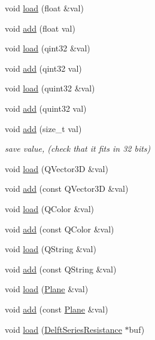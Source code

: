 \begin{DoxyCompactItemize}
void \hyperlink{classShipCAD_1_1FileBuffer_a525306d68a017ef67ec13c3e8901a8ff}{load} (float \&val)
\item 
void \hyperlink{classShipCAD_1_1FileBuffer_a7909794ac33ad5f695bb670940db99ba}{add} (float val)
\item 
void \hyperlink{classShipCAD_1_1FileBuffer_ad7fc82d31f73f0350715fb63db2fc271}{load} (qint32 \&val)
\item 
void \hyperlink{classShipCAD_1_1FileBuffer_ad5ff9b7299df09feb365250c69e6da9a}{add} (qint32 val)
\item 
void \hyperlink{classShipCAD_1_1FileBuffer_a19fcd1363671552150de3d6ee3297f2c}{load} (quint32 \&val)
\item 
void \hyperlink{classShipCAD_1_1FileBuffer_a1dd1963dd35caff15333f21cc2195b34}{add} (quint32 val)
\item 
void \hyperlink{classShipCAD_1_1FileBuffer_aa22983fa24559f6d0d119d89036100af}{add} (size\-\_\-t val)
\begin{DoxyCompactList}\small\item\em save value, (check that it fits in 32 bits) \end{DoxyCompactList}\item 
void \hyperlink{classShipCAD_1_1FileBuffer_a7255342a053689ebafda9317cc586c57}{load} (Q\-Vector3\-D \&val)
\item 
void \hyperlink{classShipCAD_1_1FileBuffer_a0642733d14682981c12f6aeaef9bb884}{add} (const Q\-Vector3\-D \&val)
\item 
void \hyperlink{classShipCAD_1_1FileBuffer_a3329cf81740c79967acc24bc0ac3c9a3}{load} (Q\-Color \&val)
\item 
void \hyperlink{classShipCAD_1_1FileBuffer_a3611327a77cc938e987ecda018d0d936}{add} (const Q\-Color \&val)
\item 
void \hyperlink{classShipCAD_1_1FileBuffer_a82c790d09c8e85c0f9d218efd9c93605}{load} (Q\-String \&val)
\item 
void \hyperlink{classShipCAD_1_1FileBuffer_aea305be34bc316cc5b849fb291499012}{add} (const Q\-String \&val)
\item 
void \hyperlink{classShipCAD_1_1FileBuffer_a4ae77da0ea26a1ed6de262ff7f3d606f}{load} (\hyperlink{classShipCAD_1_1Plane}{Plane} \&val)
\item 
void \hyperlink{classShipCAD_1_1FileBuffer_ae947c5bac13749a8b0d833bfa7979d0d}{add} (const \hyperlink{classShipCAD_1_1Plane}{Plane} \&val)
\item 
void \hyperlink{classShipCAD_1_1FileBuffer_acfa1ad9b776baa948d1724bd56b4e18d}{load} (\hyperlink{structShipCAD_1_1DelftSeriesResistance}{Delft\-Series\-Resistance} $\ast$buf)

\end{DoxyCompactItemize}
